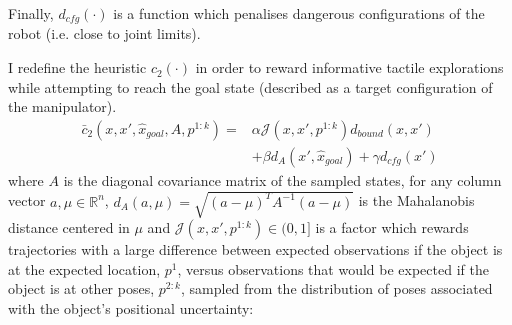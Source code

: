 Finally, $d_{cfg}(\cdot)$ is a function which penalises dangerous configurations of the robot (i.e. close to joint limits). %

I redefine the heuristic $c_2(\cdot)$ in order to reward informative tactile explorations while attempting to reach the goal state (described as a target configuration of the manipulator). 
%
\begin{equation}\label{eq:newcost2}
\begin{aligned}
\bar{c}_2(x,x',\hat{x}_{goal},A,p^{1:k})=&\alpha \mathcal{J}(x,x',p^{1:k})d_{bound}(x,x')\\
&+\beta d_A(x',\hat{x}_{goal})+\gamma d_{cfg}(x')
\end{aligned}
\end{equation}
where $A$ is the diagonal covariance matrix of the sampled states, for any column vector $a,\mu\in\mathbb{R}^n$, $d_A(a, \mu)=\sqrt{(a-\mu)^TA^{-1}(a-\mu)}$ is the Mahalanobis distance centered in $\mu$ and $\mathcal{J}(x,x',p^{1:k})\in(0,1]$ is a factor which rewards trajectories with a large difference between expected observations if the object is at the expected location, $p^1$, versus observations that would be expected if the object is at other poses, $p^{2:k}$, sampled from the distribution of poses associated with the object's positional uncertainty:
